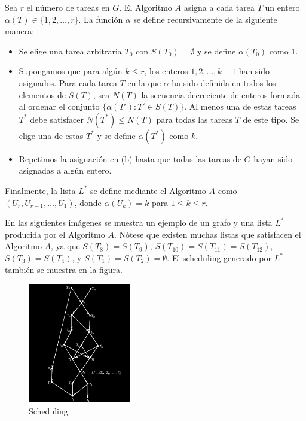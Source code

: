 \documentclass[14pt]{extarticle}
\begin{document}
Sea $r$ el número de tareas en $G$. El Algoritmo $A$ asigna a cada tarea $T$ un entero $\alpha(T) \in \{1, 2, \ldots, r\}$. La función $\alpha$ se define recursivamente de la siguiente manera:

\begin{itemize}
    \item Se elige una tarea arbitraria $T_0$ con $S(T_0) = \emptyset$ y se define $\alpha(T_0)$ como 1.
    \item Supongamos que para algún $k \leq r$, los enteros $1, 2, \ldots, k - 1$ han sido asignados. Para cada tarea $T$ en la que $\alpha$ ha sido definida en todos los elementos de $S(T)$, sea $N(T)$ la secuencia decreciente de enteros formada al ordenar el conjunto $\{\alpha(T'): T' \in S(T)\}$. Al menos una de estas tareas $T^*$ debe satisfacer $N(T^*) \leq N(T)$ para todas las tareas $T$ de este tipo. Se elige una de estas $T^*$ y se define $\alpha(T^*)$ como $k$.
    \item Repetimos la asignación en (b) hasta que todas las tareas de $G$ hayan sido asignadas a algún entero.
\end{itemize}

Finalmente, la lista $L^*$ se define mediante el Algoritmo $A$ como $(U_r, U_{r-1}, \ldots, U_1)$, donde $\alpha(U_k) = k$ para $1 \leq k \leq r$.

En las siguientes imágenes se muestra un ejemplo de un grafo y una lista $L^*$ producida por el Algoritmo $A$. Nótese que existen muchas listas que satisfacen el Algoritmo $A$, ya que $S(T_8) = S(T_9)$, $S(T_{10}) = S(T_{11}) = S(T_{12})$, $S(T_3) = S(T_4)$, y $S(T_1) = S(T_2) = \emptyset$. El scheduling generado por $L^*$ también se muestra en la figura.

\begin{figure}[h]
    \centering
    \includegraphics[width=0.4\textwidth]{images/partial_order.png}
    \caption{Scheduling}
\end{figure}
\end{document}
